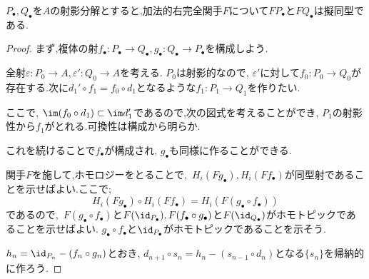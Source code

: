 \begin{prop}\label{prop:左導来関手のwell-definedness}
	$P_\bullet,Q_\bullet$を$A$の射影分解とすると,加法的右完全関手$F$について$F P_\bullet$と$F Q_\bullet$は擬同型である.
\end{prop}
\begin{proof}
	
まず,複体の射$f_\bullet:P_\bullet\to Q_\bullet,g_\bullet:Q_\bullet\to P_\bullet$を構成しよう.
	
全射$\varepsilon:P_0\to A,\varepsilon':Q_0\to A$を考える. $P_0$は射影的なので, $\varepsilon'$に対して$f_0:P_0\to Q_0$が存在する.次に$d_1'\circ f_1=f_0\circ d_1$となるような$f_1:P_1\to Q_1$を作りたい.
	
\begin{figure}[H]
	\centering
	\caption{}
\end{figure}
	
ここで, $\im(f_0\circ d_1)\subset\im d_1'$であるので,次の図式を考えることができ, $P_1$の射影性から$f_1$がとれる.可換性は構成から明らか.

\begin{figure}[H]
	\centering
	\caption{}
\end{figure}	
	
これを続けることで$f_\bullet$が構成され, $g_\bullet$も同様に作ることができる.	

関手$F$を施して,ホモロジーをとることで,~$H_i(Fg_\bullet),H_i(Ff_\bullet)$が同型射であることを示せばよい.ここで;
\[H_i(Fg_\bullet)\circ H_i(Ff_\bullet)=H_i(F(g_\bullet\circ f_\bullet))\]
であるので,~$F(g_\bullet\circ f_\bullet)$と$F(\id_{P_\bullet}),F(f_\bullet\circ g_\bullet)$と$F(\id_{Q_\bullet})$がホモトピックであることを示せばよい. $g_\bullet\circ f_\bullet$と$\id_{P_\bullet}$がホモトピックであることを示そう.

$h_n=\id_{P_n}-(f_n\circ g_n)$とおき, $d_{n+1}\circ s_n=h_n-(s_{n-1}\circ d_n)$となる$\{s_n\}$を帰納的に作ろう.


\end{proof}
